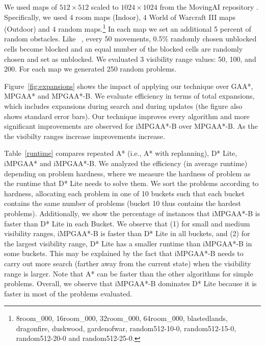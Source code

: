 \documentclass{article}
\newcommand{\acite}[1]{\citeauthor{#1}~\shortcite{#1}}
\begin{document}
We used maps of $512\times 512$ scaled to $1024 \times 1024$ from the MovingAI repository \cite{sturtevant2012benchmarks}. Specifically, we used 4 room maps (Indoor), 4 World of Warcraft III maps (Outdoor) and 4 random maps.\footnote{8room\_000, 16room\_000, 32room\_000, 64room\_000, blastedlands, dragonfire, duskwood, gardenofwar, random512-10-0, random512-15-0, random512-20-0 and random512-25-0.} In each map we set an additional 5 percent of random obstacles. Like \acite{AineL16}, every 50 movements, 0.5\% randomly chosen unblocked cells become blocked and an equal number of the blocked cells are randomly chosen and set as unblocked. We evaluated 3 visibility range values: 50, 100, and 200. For each map we generated 250 random problems.
 
Figure~\ref{fig:expansions} shows the impact of applying our technique over GAA*, MPGAA* and MPGAA*-B. We evaluate efficiency in terms of total expansions, which includes expansions during search and during updates (the figure also shows standard error bars). Our technique improves every algorithm and more significant improvements are observed for iMPGAA*-B over MPGAA*-B. As the the visibilty ranges increase improvements increase.  


Table~\ref{runtime} compares repeated A* (i.e., A* with replanning), D* Lite, iMPGAA* and iMPGAA*-B. We analyzed the efficiency (in average runtime) depending on problem hardness, where we measure the hardness of problem as the runtime that D* Lite needs to solve them. We sort the problems according to hardness, allocating each problem in one of 10 buckets such that each bucket contains the same number of problems (bucket 10 thus contains the hardest problems). Additionally, we show the percentage of instances that iMPGAA*-B is faster than D* Lite in each Bucket. We observe  that (1) for small and medium visibility ranges, iMPGAA*-B is faster than D* Lite in all buckets, and (2) for the largest visibility range, D* Lite has a smaller runtime than iMPGAA*-B in some buckets. This may be explained by the fact that iMPGAA*-B needs to carry out more search (farther away from the current state) when the visibility range is larger.  Note that A* can be faster than the other algorithms for simple problems. Overall, we observe that iMPGAA*-B dominates D* Lite because it is faster in most of the problems evaluated. 
 
\end{document}
